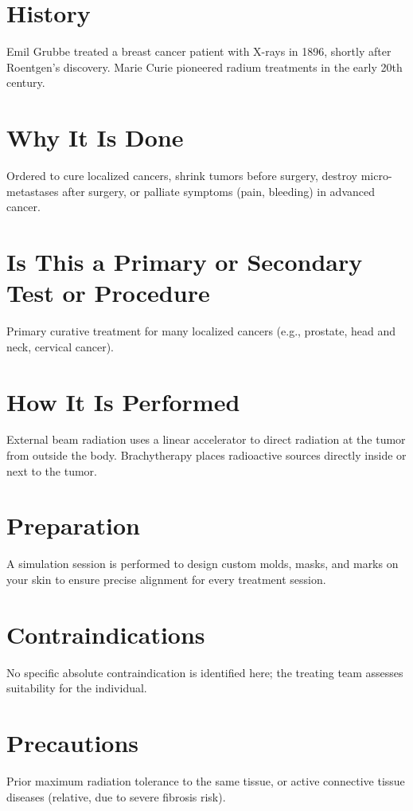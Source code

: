 \section*{History}
Emil Grubbe treated a breast cancer patient with X-rays in 1896, shortly after Roentgen's discovery. Marie Curie pioneered radium treatments in the early 20th century.

\section*{Why It Is Done}
Ordered to cure localized cancers, shrink tumors before surgery, destroy micro-metastases after surgery, or palliate symptoms (pain, bleeding) in advanced cancer.

\section*{Is This a Primary or Secondary Test or Procedure}
Primary curative treatment for many localized cancers (e.g., prostate, head and neck, cervical cancer).

\section*{How It Is Performed}
External beam radiation uses a linear accelerator to direct radiation at the tumor from outside the body. Brachytherapy places radioactive sources directly inside or next to the tumor.

\section*{Preparation}
A simulation session is performed to design custom molds, masks, and marks on your skin to ensure precise alignment for every treatment session.

\section*{Contraindications}
No specific absolute contraindication is identified here; the treating team assesses suitability for the individual.

\section*{Precautions}
Prior maximum radiation tolerance to the same tissue, or active connective tissue diseases (relative, due to severe fibrosis risk).

